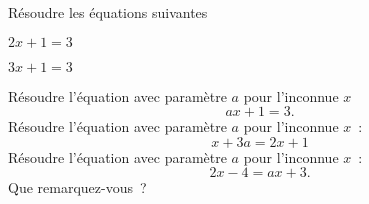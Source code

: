 \documentclass[a4paper,12pt]{article}
\begin{document}
\begin{activite}
	\tcblower
\end{activite}
\begin{activite}
	\tcblower
	\begin{tasks}
		\task Résoudre les équations suivantes

		\begin{center}	
		\begin{inlineumerate}
		\item $2x+1=3$\hspace{3cm}
		\item $3x+1=3$
		\end{inlineumerate}
		\end{center}
\task Résoudre l'équation avec paramètre $a$ pour l'inconnue $x$~ 
\[ax+1=3.\]
\vspace{-0.8cm}
\task Résoudre l'équation avec paramètre $a$ pour l'inconnue $x$~: \[x+3a=2x+1\]
\vspace{-0.8cm}
\task Résoudre l'équation avec paramètre $a$ pour l'inconnue $x$~:\[2x-4=ax+3.\]
\vspace{-0.8cm}
\task Que remarquez-vous~?
	\end{tasks}
\end{activite}
\newpage
\end{document}
